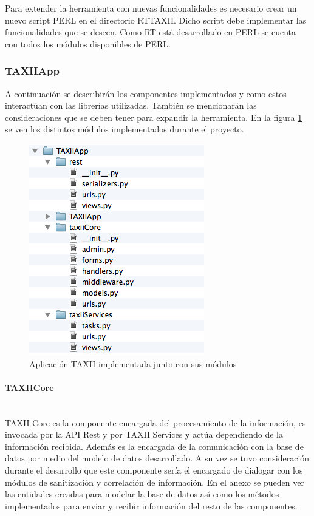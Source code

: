 Para extender la herramienta con nuevas funcionalidades es necesario crear un nuevo script PERL en el directorio RTTAXII. Dicho script debe implementar las funcionalidades que se deseen. Como RT está desarrollado en PERL se cuenta con todos los módulos disponibles de PERL.

\subsubsection{TAXIIApp}
A continuación se describirán los componentes implementados y como estos interactúan con las librerías utilizadas.
También se mencionarán las consideraciones que se deben tener para expandir la herramienta.
En la figura \ref{fig.taxii_app} se ven los distintos módulos implementados durante el proyecto. 

\begin{figure}
	\centering
	\includegraphics{imagenes/TAXIIApp.png}
	\caption{Aplicación TAXII implementada junto con sus módulos}
	\label{fig.taxii_app}
\end{figure}

\paragraph{TAXIICore}\ \\
TAXII Core es la componente encargada del procesamiento de la información, es invocada por la API Rest y por TAXII Services y actúa dependiendo de la información recibida. Además es la encargada de la comunicación con la base de datos por medio del modelo de datos desarrollado. A su vez se tuvo consideración durante el desarrollo que este componente sería el encargado de dialogar con los módulos de sanitización y correlación de información. 
En el anexo se pueden ver las entidades creadas para modelar la base de datos así como los métodos implementados para enviar y recibir información del resto de las componentes.

